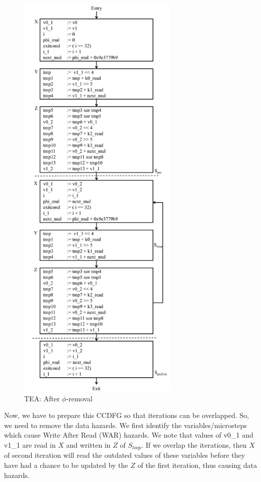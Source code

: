 \begin{figure}[H]
\begin{center}
\includegraphics[height=8in]{fig-proposal/tea-after-phi-removal}
\caption{TEA: After $\phi$-removal}
\label{fig:tea-after-phi-removal}
\end{center}
\end{figure}

Now, we have to prepare this CCDFG so that iterations can be overlapped. So, we need to remove the data hazards. We first identify the variables/microsteps which 
cause Write After Read (WAR) hazards. We note that values of v0\_1 and v1\_1 are read in $X$ and written in $Z$ of $S_{loop}$. If we overlap the iterations, then $X$ of second iteration will read the outdated values of these variables before they have had a chance to be updated by the $Z$ of the first iteration, thus causing data hazards. 

